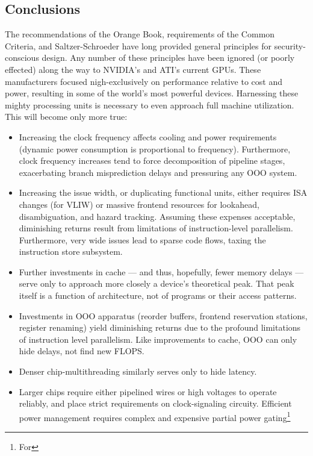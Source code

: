 \documentclass[letterpaper,10pt]{article}
\begin{document}
\begin{multicols}{2}
\section{Conclusions} 
The recommendations of the Orange Book\cite{orangebook}, requirements of the Common Criteria\cite{ccrit},
and Saltzer-Schroeder\cite{principles} have long provided general principles for
security-conscious design. Any number of these principles have been ignored
(or poorly effected) along the way to NVIDIA's and ATI's current GPUs. These
manufacturers focused nigh-exclusively on performance relative to cost and
power, resulting in some of the world's most powerful devices. Harnessing these
mighty processing units is necessary to even approach full machine utilization.
This will become only more true:
\begin{itemize}
\item Increasing the clock frequency affects cooling and power requirements
(dynamic power consumption is proportional to frequency). Furthermore,
clock frequency increases tend to force decomposition of pipeline
stages, exacerbating branch misprediction delays and pressuring any OOO
system\cite{cormean}.
\item Increasing the issue width, or duplicating functional units, either
requires ISA changes (for VLIW) or massive frontend resources for lookahead,
disambiguation, and hazard tracking. Assuming these expenses acceptable,
diminishing returns result from limitations of instruction-level parallelism.
Furthermore, very wide issues lead to sparse code flows, taxing the instruction
store subsystem. 
\item Further investments in cache --- and thus, hopefully, fewer memory
delays --- serve only to approach more closely a device's theoretical peak.
That peak itself is a function of architecture, not of programs or their
access patterns.
\item Investments in OOO apparatus (reorder buffers,
frontend reservation stations, register renaming) yield diminishing returns due
to the profound limitations of instruction level parallelism\cite{phenn}. Like improvements
to cache, OOO can only hide delays, not find new FLOPS.
\item Denser chip-multithreading similarly serves only to hide latency.
\item Larger chips require either pipelined wires or high voltages to operate
reliably, and place strict requirements on clock-signaling circuity. Efficient
power management requires complex and expensive partial power gating\footnote{For
}
\end{itemize}
\end{multicols}
\end{document}
